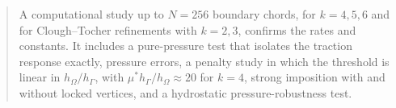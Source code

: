 \documentclass[11pt,reqno]{amsart}
\theoremstyle{plain}
\theoremstyle{definition}
\begin{document}
\begin{abstract}
A computational study up to $N=256$ boundary chords, for $k=4,5,6$ and for Clough--Tocher refinements with $k=2,3$, confirms the rates and constants. It includes a pure-pressure test that isolates the traction response exactly, pressure errors, a penalty study in which the threshold is linear in $h_\Omega/h_\Gamma$, with $\mu^\ast h_\Gamma/h_\Omega\approx20$ for $k=4$, strong imposition with and without locked vertices, and a hydrostatic pressure-robustness test.
\end{abstract}

\maketitle





















\appendix






\end{document}
